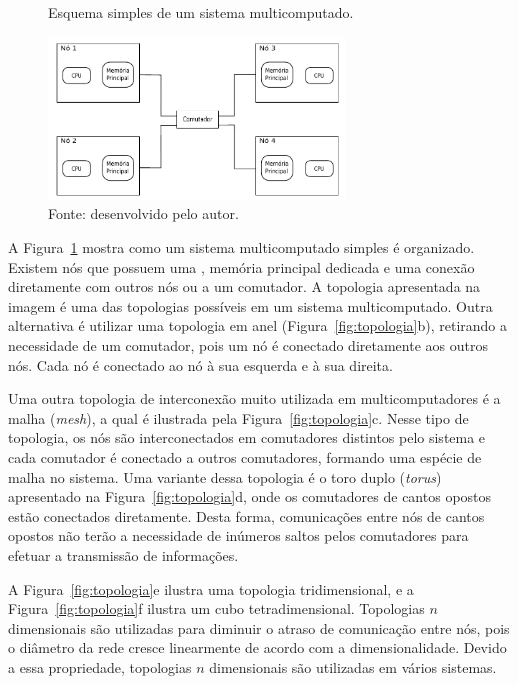 \begin{figure}[t]
	\centering
    \caption{Esquema simples de um sistema multicomputado.}
        \includegraphics[width=0.7\textwidth]{figs/multicomp.pdf}
        \caption*{Fonte: desenvolvido pelo autor.}
        \label{fig:multicomputado}
\end{figure}



A Figura~\ref{fig:multicomputado} mostra como um sistema multicomputado simples é
organizado. Existem nós que possuem uma \cpu, memória principal dedicada e uma
conexão diretamente com outros nós ou a um comutador. A topologia apresentada na
imagem é uma das topologias possíveis em um sistema multicomputado. Outra
alternativa é utilizar uma topologia em anel (Figura~\ref{fig:topologia}b), retirando a necessidade de um
comutador, pois um nó é conectado diretamente aos outros nós. Cada nó é
conectado ao nó à sua esquerda e à sua direita.

Uma outra topologia de interconexão muito utilizada em multicomputadores é a malha (\textit{mesh}),
a qual é ilustrada pela Figura~\ref{fig:topologia}c. Nesse tipo de topologia, os nós são interconectados
em comutadores distintos pelo sistema e cada comutador é conectado a outros
comutadores, formando uma espécie de malha no sistema. Uma variante dessa
topologia é o toro duplo (\textit{torus}) apresentado na Figura~\ref{fig:topologia}d, onde os
comutadores de cantos opostos estão conectados diretamente. Desta forma,
comunicações entre nós de cantos opostos não terão a necessidade de inúmeros
saltos pelos comutadores para efetuar a transmissão de informações.

A Figura~\ref{fig:topologia}e ilustra uma topologia tridimensional, e a
Figura~\ref{fig:topologia}f ilustra um cubo tetradimensional. Topologias
$n$ dimensionais são utilizadas para diminuir o atraso de comunicação entre nós,
pois o diâmetro da rede cresce linearmente de acordo com a dimensionalidade.
Devido a essa propriedade, topologias $n$ dimensionais são utilizadas em
vários sistemas.

